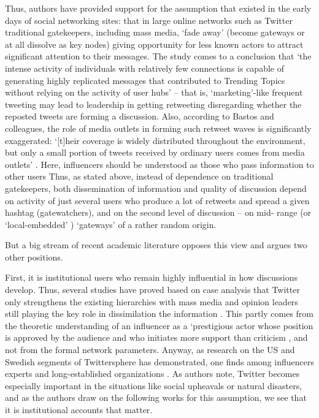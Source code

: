 Thus, authors \cite{BastosRaimundoTravitzki} have provided support for the assumption that existed in the early days of social networking sites: that in large online networks such as Twitter traditional gatekeepers, including mass media, ‘fade away’ (become gateways or at all dissolve as key nodes) giving opportunity for less known actors to attract significant attention to their messages. The study comes to a conclusion that ‘the intense activity of individuals with relatively few connections is capable of generating highly replicated messages that contributed to Trending Topics without relying on the activity of user hubs’ \cite[p.~260]{BastosRaimundoTravitzki} -- that is, ‘marketing’-like frequent tweeting may lead to leadership in getting retweeting disregarding whether the reposted tweets are forming a discussion. Also, according to Bastos and colleagues, the role of media outlets in forming such retweet waves is significantly exaggerated: ‘[t]heir coverage is widely distributed throughout the environment, but only a small portion of tweets received by ordinary users comes from media outlets’ \cite[p.~269]{BastosRaimundoTravitzki}. Here, influencers should be understood as those who pass information to other users Thus, as stated above, instead of dependence on traditional gatekeepers, both dissemination of information and quality of discussion depend on activity of just several users who produce a lot of retweets and spread a given hashtag (gatewatchers), and on the second level of discussion -- on mid- range (or ‘local-embedded’ \cite{DuboisGaffney}) ‘gateways’ of a rather random origin.

But a big stream of recent academic literature opposes this view and argues two other positions.

First, it is institutional users who remain highly influential in how discussions develop. Thus, several studies have proved based on case analysis that Twitter only strengthens the existing hierarchies with mass media and opinion leaders still playing the key role in dissimilation the information \cite{JungherrJuergens,WuHofmanMason,VaccariValerianiBarbera}. This partly comes from the theoretic understanding of an influencer as a ‘prestigious actor whose position is approved by the audience and who initiates more support than criticism \cite{Adam}, and not from the formal network parameters. Anyway, as research on the US and Swedish segments of Twittersphere has demonstrated, one finds among influencers experts and long-established organizations \cite{FoxZickuhrSmith,Page}. As authors \cite{HladikStetka} note, Twitter becomes especially important in the situations like social upheavals or natural disasters, and as the authors draw on the following works \cite{Vis,Bruns} for this assumption, we see that it is institutional accounts that matter.

